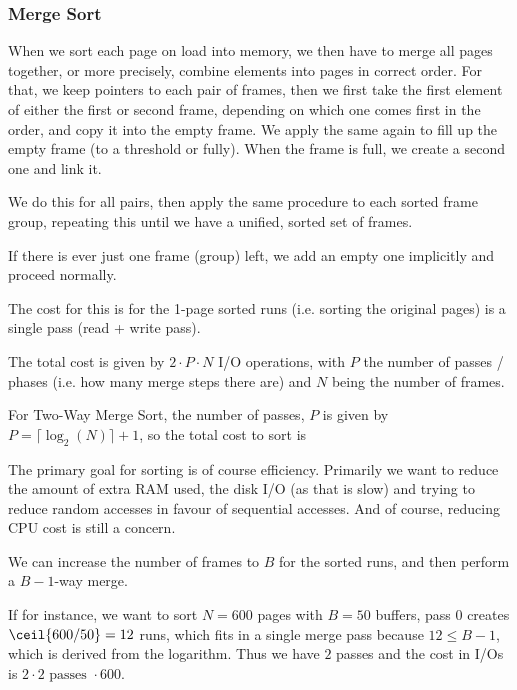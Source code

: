 \subsubsection{Merge Sort}
When we sort each page on load into memory, we then have to merge all pages together, or more precisely, combine elements into pages in correct order.
For that, we keep pointers to each pair of frames, then we first take the first element of either the first or second frame, depending on which one comes first in the order,
and copy it into the empty frame. We apply the same again to fill up the empty frame (to a threshold or fully). When the frame is full, we create a second one and link it.

We do this for all pairs, then apply the same procedure to each sorted frame group, repeating this until we have a unified, sorted set of frames.

If there is ever just one frame (group) left, we add an empty one implicitly and proceed normally.

The cost for this is for the 1-page sorted runs (i.e. sorting the original pages) is a single pass (read + write pass).

The total cost is given by $2 \cdot P \cdot N$ I/O operations, with $P$ the number of passes / phases (i.e. how many merge steps there are) and $N$ being the number of frames.

For Two-Way Merge Sort, the number of passes, $P$ is given by $P = \lceil \log_2(N) \rceil + 1$,
so the total cost to sort is 

The primary goal for sorting is of course efficiency. Primarily we want to reduce the amount of extra RAM used, the disk I/O (as that is slow) and trying to reduce random accesses
in favour of sequential accesses. And of course, reducing CPU cost is still a concern.

We can increase the number of frames to $B$ for the sorted runs, and then perform a $B - 1$-way merge.

If for instance, we want to sort $N = 600$ pages with $B = 50$ buffers, pass $0$ creates $\ceil{600 / 50} = 12$ runs,
which fits in a single merge pass because $12 \leq B - 1$, which is derived from the logarithm.
Thus we have $2$ passes and the cost in I/Os is $2 \cdot 2 \text{ passes } \cdot 600$.
